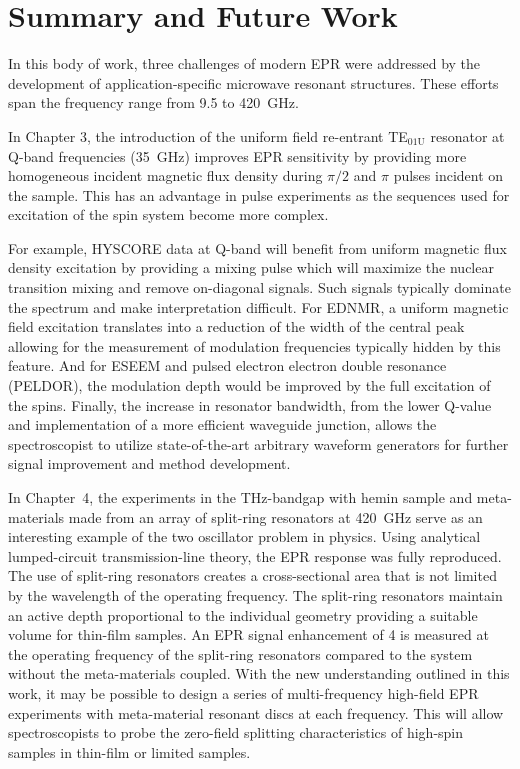 \chapter[Summary and Future Work]{Summary and Future Work}

In this body of work, three challenges of modern EPR were addressed by the development of application-specific microwave resonant structures. These efforts span the frequency range from 9.5 to 420~GHz.

In Chapter 3, the introduction of the uniform field re-entrant TE$_{\text{01U}}$ resonator at Q-band frequencies (35~GHz) improves EPR sensitivity by providing more homogeneous incident magnetic flux density during $\pi/2$ and $\pi$ pulses incident on the sample. This has an advantage in pulse experiments as the sequences used for excitation of the spin system become more complex. 

For example, HYSCORE data at Q-band will benefit from uniform magnetic flux density excitation by providing a mixing pulse which will maximize the nuclear transition mixing and remove on-diagonal signals. \cite{Doorslaer2007,Harmer2009} Such signals typically dominate the spectrum and make interpretation difficult. For EDNMR, a uniform magnetic field excitation translates into a reduction of the width of the central peak allowing for the measurement of modulation frequencies typically hidden by this feature. \cite{NicholasCox2013} And for ESEEM and pulsed electron electron double resonance (PELDOR), the modulation depth would be improved by the full excitation of the spins. Finally, the increase in resonator bandwidth, from the lower Q-value and implementation of a more efficient waveguide junction, allows the spectroscopist to utilize state-of-the-art arbitrary waveform generators for further signal improvement and method development. \cite{DOLL201327,dSegawa2015,SPINDLER201730,WILI201826,PRISNER201998}

In Chapter~4, the experiments in the THz-bandgap with hemin sample and meta-materials made from an array of split-ring resonators at 420~GHz serve as an interesting example of the two oscillator problem in physics. Using analytical lumped-circuit transmission-line theory, the EPR response was fully reproduced. The use of split-ring resonators creates a cross-sectional area that is not limited by the wavelength of the operating frequency. The split-ring resonators maintain an active depth proportional to the individual geometry providing a suitable volume for thin-film samples. An EPR signal enhancement of 4 is measured at the operating frequency of the split-ring resonators compared to the system without the meta-materials coupled. With the new understanding outlined in this work, it may be possible to design a series of multi-frequency high-field EPR experiments with meta-material resonant discs at each frequency. This will allow spectroscopists to probe the zero-field splitting characteristics of high-spin samples in thin-film or limited samples.

